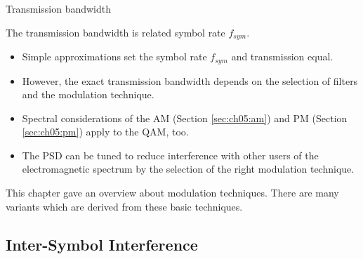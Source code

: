 \begin{refsection}
\begin{excursus}{Transmission bandwidth}
	\vspace{1em}
	
	The transmission bandwidth is related symbol rate $f_{sym}$. 
	\begin{itemize}
		\item Simple approximations set the symbol rate $f_{sym}$ and transmission equal.
		\item However, the exact transmission bandwidth depends on the selection of filters and the modulation technique.
		\item Spectral considerations of the \ac{AM} (Section \ref{sec:ch05:am}) and \ac{PM} (Section \ref{sec:ch05:pm}) apply to the \ac{QAM}, too.
		\item The \ac{PSD} can be tuned to reduce interference with other users of the electromagnetic spectrum by the selection of the right modulation technique.
	\end{itemize}

	This chapter gave an overview about modulation techniques. There are many variants which are derived from these basic techniques.
\end{excursus}

\subsection{Inter-Symbol Interference}

\begin{figure}[H]
	\centering
\end{figure}
\end{refsection}
